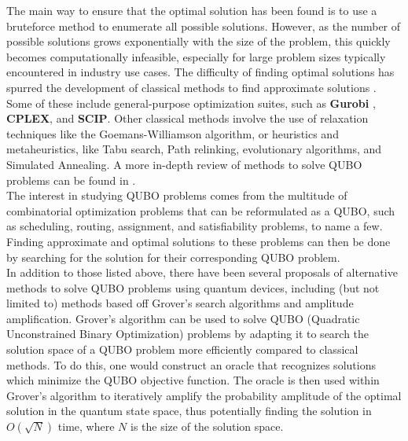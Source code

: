 \documentclass[12pt,a4paper]{report}
\begin{document}
\noindent
The main way to ensure that the optimal solution has been found is to use a bruteforce method to enumerate all possible solutions. However, as the number of possible solutions grows exponentially with the size of the problem, this quickly becomes computationally infeasible, especially for large problem sizes typically encountered in industry use cases. The difficulty of finding optimal solutions has spurred the development of classical methods to find approximate solutions \cite{approximate_solutions_np, approximate_solutions_np2, book_approx_solutions}. Some of these include general-purpose optimization suites, such as \textbf{Gurobi} \cite{Gurobi2023}, \textbf{CPLEX}, and \textbf{SCIP}. Other classical methods involve the use of relaxation techniques like the Goemans-Williamson algorithm, or heuristics and metaheuristics, like Tabu search, Path relinking, evolutionary algorithms, and Simulated Annealing. A more in-depth review of methods to solve QUBO problems can be found in \cite{Punnen2022}.
\\

\noindent
The interest in studying QUBO problems comes from the multitude of combinatorial optimization problems that can be reformulated as a QUBO, such as scheduling, routing, assignment, and satisfiability problems, to name a few. Finding approximate and optimal solutions to these problems can then be done by searching for the solution for their corresponding QUBO problem.
\\

\noindent
In addition to those listed above, there have been several proposals of alternative methods to solve QUBO problems using quantum devices, including (but not limited to) methods based off Grover’s search algorithms and amplitude amplification. Grover's algorithm can be used to solve QUBO (Quadratic Unconstrained Binary Optimization) problems by adapting it to search the solution space of a QUBO problem more efficiently compared to classical methods. To do this, one would construct an oracle that recognizes solutions which minimize the QUBO objective function. The oracle is then used within Grover's algorithm to iteratively amplify the probability amplitude of the optimal solution in the quantum state space, thus potentially finding the solution in $O(\sqrt{N})$ time, where $N$ is the size of the solution space.
\\
\end{document}
